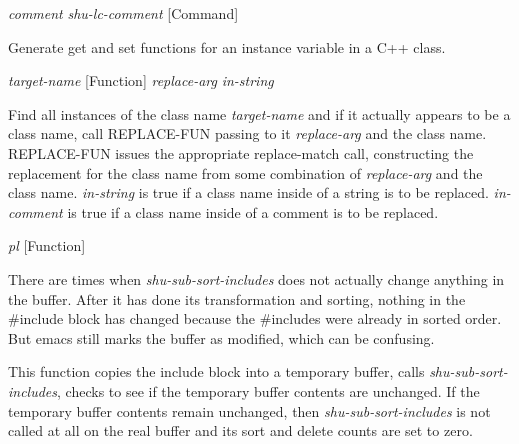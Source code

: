 \vspace{1em}
\noindent
{}
\usebox{\funcname}\emph{comment} \emph{shu-lc-comment}
 \hfill [Command]

\begin{doc-string}
Generate get and set functions for an instance variable in a C++ class.
\end{doc-string}

\vspace{1em}
\noindent
{}
\usebox{\funcname}\emph{target-name}
 \hfill [Function]
\hspace*{\wd\funcname}\emph{replace-arg}
\hspace*{\wd\funcname}\emph{in-string}
\hspace*{\wd\funcname}

\begin{doc-string}
Find all instances of the class name \emph{target-name} and if it actually appears
to be a class name, call REPLACE-FUN passing to it \emph{replace-arg} and the class
name.  REPLACE-FUN issues the appropriate replace-match call, constructing the
replacement for the class name from some combination of \emph{replace-arg} and the
class name.  \emph{in-string} is true if a class name inside of a string is to be
replaced.  \emph{in-comment} is true if a class name inside of a comment is to be
replaced.
\end{doc-string}

\vspace{1em}
\noindent
{}
\usebox{\funcname}\emph{pl}
 \hfill [Function]

\begin{doc-string}
There are times when \emph{shu-sub-sort-includes} does not actually change anything
in the buffer.  After it has done its transformation and sorting, nothing in the
\#include block has changed because the \#includes were already in sorted order.
But emacs still marks the buffer as modified, which can be confusing.

This function copies the include block into a temporary buffer, calls
\emph{shu-sub-sort-includes}, checks to see if the temporary buffer contents are
unchanged.  If the temporary buffer contents remain unchanged, then
\emph{shu-sub-sort-includes} is not called at all on the real buffer and its sort and
delete counts are set to zero.
\end{doc-string}

